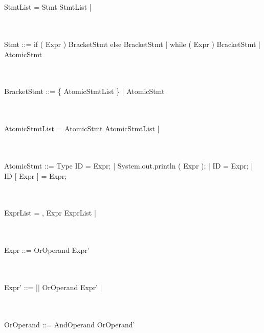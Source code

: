 \documentclass[a4paper,portrait,12pt]{article}
\begin{document}
\\~\\
StmtList =	Stmt StmtList						\newline
\hspace*{.625in} | \epsilon

\\~\\
Stmt ::=	if ( Expr ) BracketStmt else BracketStmt	\newline
\hspace*{.625in} | while ( Expr ) BracketStmt		\newline
\hspace*{.625in} | AtomicStmt

\\~\\
BracketStmt ::=	\{ AtomicStmtList \}			\newline
\hspace*{.625in} | AtomicStmt

\\~\\
AtomicStmtList =	AtomicStmt AtomicStmtList	\newline
\hspace*{.625in} | \epsilon

\\~\\
AtomicStmt ::= Type ID = Expr;					\newline
\hspace*{.625in} | System.out.println ( Expr );	\newline
\hspace*{.625in} | ID = Expr;					\newline
\hspace*{.625in} | ID [ Expr ] = Expr;


\\~\\
ExprList =	, Expr ExprList	\newline
\hspace*{.625in} | \epsilon

\\~\\
Expr ::=	OrOperand Expr'

\\~\\
Expr' ::=	|| OrOperand Expr'				\newline
\hspace*{.625in} | \epsilon

\\~\\
OrOperand ::=	AndOperand OrOperand'
\end{document}
